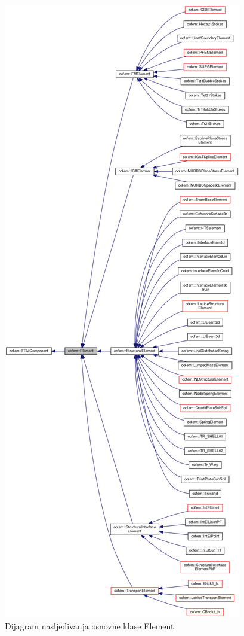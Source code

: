 \documentclass[a4paper,twoside,12pt]{memoir} %
\begin{document}
\begin{figure}[h!t]
\begin{center}
\includegraphics[scale=0.21]{pictures/chapter_oofem/Element_inhereitnace.png}
\caption{Dijagram nasljeđivanja osnovne klase Element \cite{oofem_reference}}
\label{fig:Element_inheritance}
\end{center}
\end{figure}
\end{document}
